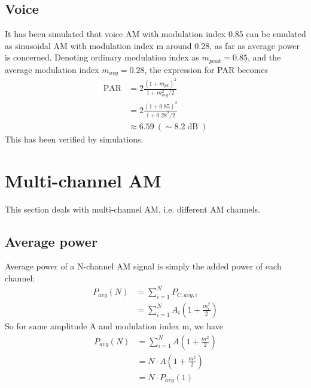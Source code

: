 \documentclass[12pt]{article}
\DeclareMathOperator{\PAR}{PAR}
\DeclareMathOperator{\dB}{dB}
\begin{document}
\subsection{Voice}

It has been simulated that voice AM with modulation index 0.85 can be emulated as sinusoidal AM with modulation index m around 0.28, as far as average power is concerned. Denoting ordinary modulation index as $m_{peak} = 0.85$, and the average modulation index $m_{avg} = 0.28$, the expression for PAR becomes
\begin{equation}
\begin{aligned}
\PAR   & = 2 \frac{( 1 + m_{pk} )^2 }{ 1 + m_{avg}^2 / 2} \\
       & = 2 \frac{( 1 + 0.85 )^2 }{ 1 + 0.28^2 / 2} \\
       & \approx 6.59 \ (\sim 8.2 \dB)
\end{aligned}
\end{equation}
This has been verified by simulations.

\section{Multi-channel AM}

This section deals with multi-channel AM, i.e. different AM channels.

\subsection{Average power}

Average power of a N-channel AM signal is simply the added power of each channel:
\begin{equation}
\begin{aligned}
P_{avg}(N) & = \sum_{i=1}^{N}  P_{C,avg,i} \\
        & = \sum_{i=1}^{N} A_i (1 + \frac{m_i^2}{2})
\end{aligned}
\end{equation}
So for same amplitude A and modulation index m, we have
\begin{equation}
\begin{aligned}
P_{avg}(N) & = \sum_{i=1}^{N} A (1 + \frac{m^2}{2}) \\
           & = N \cdot A (1 + \frac{m^2}{2}) \\
           & = N \cdot P_{avg}(1) \\
\end{aligned}
\end{equation}
\end{document}
